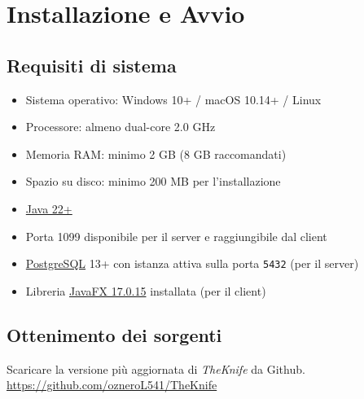 \section{Installazione e Avvio}
\label{cap:installazione}
\subsection{Requisiti di sistema}
\begin{itemize}
    \item Sistema operativo: Windows 10+ / macOS 10.14+ / Linux
    \item Processore: almeno dual-core 2.0 GHz
    \item Memoria RAM: minimo 2 GB (8 GB raccomandati)
    \item Spazio su disco: minimo 200 MB per l'installazione
    \item \href{www.java.com}{Java 22+}
    \item Porta 1099 disponibile per il server e raggiungibile dal client
    \item \href{www.postgresql.org}{PostgreSQL} 13+ con istanza attiva sulla porta \texttt{5432} (per il server)
    \item Libreria \href{https://gluonhq.com/products/javafx/}{JavaFX 17.0.15} installata (per il client)
\end{itemize}

\subsection{Ottenimento dei sorgenti}
Scaricare la versione più aggiornata di \textit{TheKnife} da Github.\\
\href{https://github.com/ozneroL541/TheKnife}{https://github.com/ozneroL541/TheKnife}

